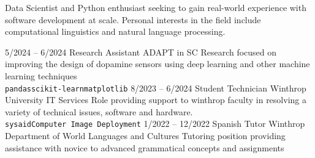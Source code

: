 \documentclass[9pt]{developercv} %
\begin{document}
\vspace{0.5cm}



\begin{minipage}[t]{0.4\textwidth} %
	\vspace{-\baselineskip} %
	
	Data Scientist and Python enthusiast seeking to gain real-world experience with software development at scale. Personal interests in the field include computational linguistics and natural language processing. \\ %
\end{minipage}
\hfill %
\begin{minipage}[t]{0.5\textwidth} %
	\vspace{-\baselineskip} %
	\begin{barchart}{5.5}
	\end{barchart}
\end{minipage}



\begin{entrylist}
	\entry
    {5/2024 -- 6/2024}
		{Research Assistant}
		{ADAPT in SC}
        {Research focused on improving the design of dopamine sensors using deep learning and other machine learning techniques\\ \texttt{pandas}\slashsep\texttt{scikit-learn}\slashsep\texttt{matplotlib}}
	\entry
		{8/2023 -- 6/2024}
		{Student Technician}
		{Winthrop University IT Services}
        {Role providing support to winthrop faculty in resolving a variety of technical issues, software and hardware. \\ \texttt{sysaid}\slashsep \texttt{Computer Image Deployment}}
	\entry
		{1/2022 -- 12/2022}
		{Spanish Tutor}
		{Winthrop Department of World Languages and Cultures}
        {Tutoring position providing assistance with novice to advanced grammatical concepts and assignments}
\end{entrylist}
\end{document}

